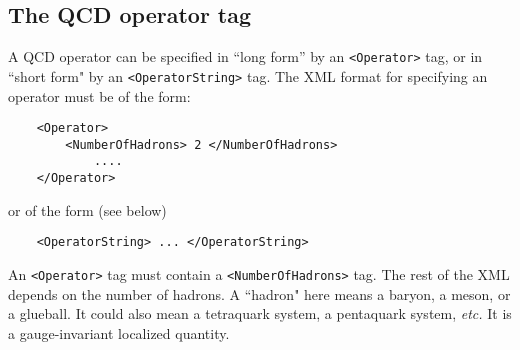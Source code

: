 \documentclass[12pt]{article}
\newcommand{\vb}{\texttt}
\begin{document}
\subsection{The QCD operator tag} \label{sec:qcd_op_tag}
A QCD operator can be specified in ``long form'' by an \vb{<Operator>} tag,
or in ``short form" by an \vb{<OperatorString>} tag.
The XML format for specifying an operator must be of the form:   
\begin{verbatim}                                           
    <Operator>                                                
        <NumberOfHadrons> 2 </NumberOfHadrons>                 
            ....                                              
    </Operator>                                               
\end{verbatim}                                                              
or of the form (see below)                                    
\begin{verbatim}                                                                                                      
    <OperatorString> ... </OperatorString>                    
\end{verbatim}                                                              
An \vb{<Operator>} tag must contain a \vb{<NumberOfHadrons>} tag.      
The rest of the XML depends on the number of hadrons.         
A ``hadron" here means a baryon, a meson, or a glueball.       
It could also mean a tetraquark system, a pentaquark system,  
\textit{etc.}  It is a gauge-invariant localized quantity.            
\end{document}
